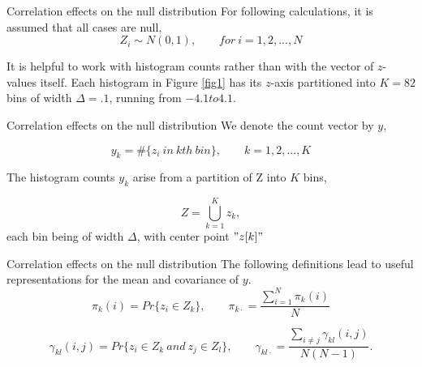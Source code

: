 \documentclass{beamer}
\begin{document}
\begin{frame}[t]{Correlation effects on the null distribution}\vspace{10pt}
For following calculations, it is assumed that all cases are null,
\begin{equation}\label{eq3}
Z_i \sim N(0,1), \qquad  for \ i=1,2,...,N
\end{equation}

It is helpful to work with histogram counts rather than with the vector of $z$-values itself. Each histogram in Figure \ref{fig1} has its $z$-axis partitioned into $K = 82$ bins of width $\Delta = .1$, running from $−4.1 to 4.1$.

\end{frame}

\begin{frame}[t]{Correlation effects on the null distribution}\vspace{10pt}
We denote the count vector by $y$,

\begin{equation}\label{eq4}
y_k = \#\{z_i \ in \ kth \ bin \}, \qquad k=1,2,...,K
\end{equation}

The histogram counts $y_k$ arise from a partition of Z into $K$ bins,

\begin{equation}\label{eq5}
Z = \bigcup_{k=1}^K z_k,	
\end{equation}
each bin being of width $\Delta$, with center point $"z[k]"$

\end{frame}


\begin{frame}[t]{Correlation effects on the null distribution}\vspace{10pt}
The following definitions lead to useful representations for the mean and covariance of $y$.
\begin{equation}\label{eq6}
\pi_k(i) = Pr\{z_i \in Z_k \}, \qquad \pi_{k\cdot}=\frac{\sum_{i=1}^N \pi_k(i)}{N}
\end{equation}

\begin{equation}\label{eq7}
\gamma_{kl}(i,j) = Pr \{z_i \in Z_k \ and \ z_j \in Z_l \}, \qquad
\gamma_{kl\cdot}=\frac{\sum_{i \neq j} \gamma_{kl}(i,j) } {N(N-1)}.
\end{equation}

\end{frame}
\end{document}
